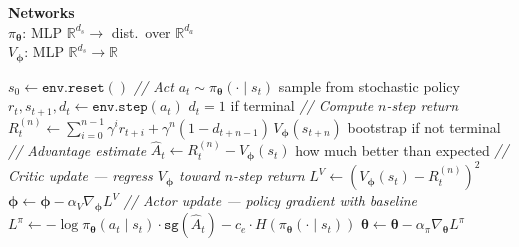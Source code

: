 \documentclass[11pt]{article}
\begin{document}
\begin{algorithm}[p]
\begin{minipage}[t]{0.28\linewidth}
\vspace{6pt}
\textbf{Networks} \\[2pt]
$\pi_{\boldsymbol{\theta}}$: MLP $\mathbb{R}^{d_s} \to$ dist.\ over $\mathbb{R}^{d_a}$ \\
$V_{\boldsymbol{\phi}}$: MLP $\mathbb{R}^{d_s} \to \mathbb{R}$
\end{minipage}%
\hfill
\vrule
\hfill
\begin{minipage}[t]{0.68\linewidth}
\begin{algorithmic}[1]
    \State $s_0 \gets \texttt{env.reset}()$
        \Statex \hspace{\algorithmicindent}\hspace{\algorithmicindent}\textit{// Act}
        \State $a_t \sim \pi_{\boldsymbol{\theta}}(\cdot \mid s_t)$ \hfill sample from stochastic policy
        \State $r_t, s_{t+1}, d_t \gets \texttt{env.step}(a_t)$ \hfill $d_t = 1$ if terminal
        \Statex \hspace{\algorithmicindent}\hspace{\algorithmicindent}\textit{// Compute $n$-step return}
        \State $R_t^{(n)} \gets \sum_{i=0}^{n-1} \gamma^i r_{t+i} + \gamma^n (1 - d_{t+n-1})\, V_{\boldsymbol{\phi}}(s_{t+n})$
        \Statex \hspace{\algorithmicindent}\hspace{\algorithmicindent}\hfill bootstrap if not terminal
        \Statex \hspace{\algorithmicindent}\hspace{\algorithmicindent}\textit{// Advantage estimate}
        \State $\hat{A}_t \gets R_t^{(n)} - V_{\boldsymbol{\phi}}(s_t)$ \hfill how much better than expected
        \Statex \hspace{\algorithmicindent}\hspace{\algorithmicindent}\textit{// Critic update --- regress $V_{\boldsymbol{\phi}}$ toward $n$-step return}
        \State $L^V \gets (V_{\boldsymbol{\phi}}(s_t) - R_t^{(n)})^2$
        \State $\boldsymbol{\phi} \gets \boldsymbol{\phi} - \alpha_V \nabla_{\boldsymbol{\phi}} L^V$
        \Statex \hspace{\algorithmicindent}\hspace{\algorithmicindent}\textit{// Actor update --- policy gradient with baseline}
        \State $L^\pi \gets -\log \pi_{\boldsymbol{\theta}}(a_t \mid s_t) \cdot \texttt{sg}(\hat{A}_t) - c_e \cdot H(\pi_{\boldsymbol{\theta}}(\cdot \mid s_t))$
        \State $\boldsymbol{\theta} \gets \boldsymbol{\theta} - \alpha_\pi \nabla_{\boldsymbol{\theta}} L^\pi$
    \EndFor
\EndFor
\end{algorithmic}
\end{minipage}
\end{algorithm}
\end{document}
